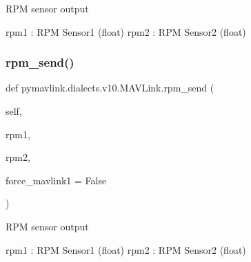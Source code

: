 \begin{DoxyVerb}
\begin{DoxyVerb}
\begin{DoxyVerb}
\begin{DoxyVerb}
\begin{DoxyVerb}
\begin{DoxyVerb}
\begin{DoxyVerb}
\begin{DoxyVerb}
\begin{DoxyVerb}
\begin{DoxyVerb}
\begin{DoxyVerb}RPM sensor output

rpm1                      : RPM Sensor1 (float)
rpm2                      : RPM Sensor2 (float)\end{DoxyVerb}
 \mbox{\label{classpymavlink_1_1dialects_1_1v10_1_1MAVLink_a2ca6319e17249ccec4c316ce69b58220}} 
\subsubsection{\texorpdfstring{rpm\+\_\+send()}{rpm\_send()}}
{\footnotesize\ttfamily def pymavlink.\+dialects.\+v10.\+M\+A\+V\+Link.\+rpm\+\_\+send (\begin{DoxyParamCaption}\item[{}]{self,  }\item[{}]{rpm1,  }\item[{}]{rpm2,  }\item[{}]{force\+\_\+mavlink1 = {\ttfamily False} }\end{DoxyParamCaption})}

\begin{DoxyVerb}RPM sensor output

rpm1                      : RPM Sensor1 (float)
rpm2                      : RPM Sensor2 (float)\end{DoxyVerb}
 \mbox{\label{classpymavlink_1_1dialects_1_1v10_1_1MAVLink_a07fa89afec35939d13ac6aea990a5c8d}} 

\end{DoxyVerb}
\end{DoxyVerb}
\end{DoxyVerb}
\end{DoxyVerb}
\end{DoxyVerb}
\end{DoxyVerb}
\end{DoxyVerb}
\end{DoxyVerb}
\end{DoxyVerb}
\end{DoxyVerb}
